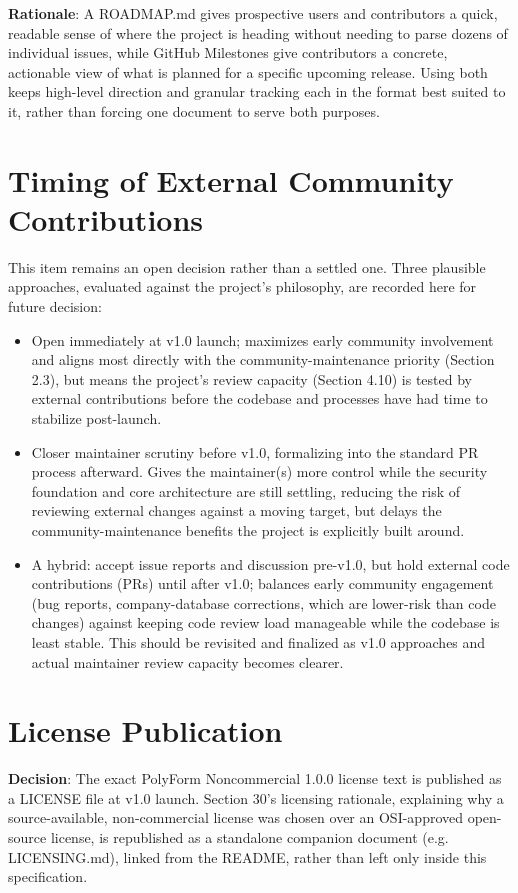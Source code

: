 \textbf{Rationale}: A ROADMAP.md gives prospective users and contributors a quick, readable sense of where the project is heading without needing to parse dozens of individual issues, while GitHub Milestones give contributors a concrete, actionable view of what is planned for a specific upcoming release. Using both keeps high-level direction and granular tracking each in the format best suited to it, rather than forcing one document to serve both purposes.
\section{Timing of External Community Contributions}
This item remains an open decision rather than a settled one. Three plausible approaches, evaluated against the project's philosophy, are recorded here for future decision:
\begin{itemize}
	\item Open immediately at v1.0 launch; maximizes early community involvement 	and aligns most directly with the community-maintenance priority (Section 2.3), but means the project's review capacity (Section 4.10) is tested by external contributions before the codebase and processes have had time to stabilize post-launch.
	
	\item Closer maintainer scrutiny before v1.0, formalizing into the standard PR 	process afterward. Gives the maintainer(s) more control while the security foundation and core architecture are still settling, reducing the risk of reviewing external changes against a moving target, but delays the\\community-maintenance benefits the project is explicitly built around.
	
	\item A hybrid: accept issue reports and discussion pre-v1.0, but hold external code contributions (PRs) until after v1.0; balances early community engagement (bug reports, company-database corrections, which are lower-risk than code changes) against keeping code review load 	manageable while the codebase is least stable.
This should be revisited and finalized as v1.0 approaches and actual maintainer review capacity becomes clearer.
\end{itemize}	

\section{License Publication}
\textbf{Decision}: The exact PolyForm Noncommercial 1.0.0 license text is published as a LICENSE file at v1.0 launch. Section 30's licensing rationale, explaining why a source-available, non-commercial license was chosen over an OSI-approved open-source license, is republished as a standalone companion document (e.g. LICENSING.md), linked from the README, rather than left only inside this specification.

